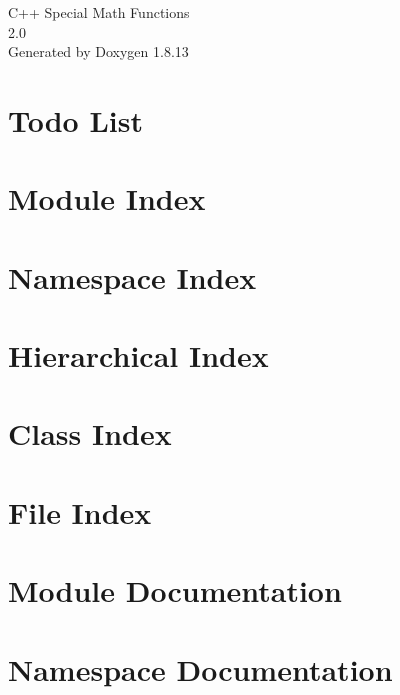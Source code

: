 \documentclass[twoside]{book}
\newcommand{\+}{\discretionary{\mbox{\scriptsize$\hookleftarrow$}}{}{}}
\newcommand{\clearemptydoublepage}{%
  \newpage{\pagestyle{empty}\cleardoublepage}%
}
\begin{document}
\hypersetup{pageanchor=false,
             bookmarksnumbered=true,
             pdfencoding=unicode
            }
\begin{titlepage}
\vspace*{7cm}
\begin{center}%
{\Large C++ Special Math Functions \\[1ex]\large 2.\+0 }\\
\vspace*{1cm}
{\large Generated by Doxygen 1.8.13}\\
\end{center}
\end{titlepage}
\clearemptydoublepage
{}
\tableofcontents
\clearemptydoublepage
{}
\hypersetup{pageanchor=true}

\chapter{Todo List}
\label{todo}

\chapter{Module Index}

\chapter{Namespace Index}

\chapter{Hierarchical Index}

\chapter{Class Index}

\chapter{File Index}

\chapter{Module Documentation}



\chapter{Namespace Documentation}



\end{document}
